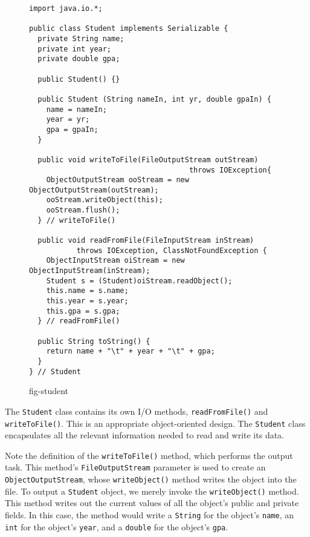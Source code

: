 \begin{figure}[tb]
\jjjprogstart
\begin{jjjlisting}[31pc]
\begin{lstlisting}
import java.io.*;

public class Student implements Serializable {
  private String name;
  private int year;
  private double gpa;

  public Student() {}

  public Student (String nameIn, int yr, double gpaIn) {
    name = nameIn;
    year = yr;
    gpa = gpaIn;
  }

  public void writeToFile(FileOutputStream outStream) 
                                     throws IOException{
    ObjectOutputStream ooStream = new ObjectOutputStream(outStream);
    ooStream.writeObject(this);
    ooStream.flush();
  } // writeToFile()

  public void readFromFile(FileInputStream inStream)  
           throws IOException, ClassNotFoundException {
    ObjectInputStream oiStream = new ObjectInputStream(inStream);
    Student s = (Student)oiStream.readObject();
    this.name = s.name;
    this.year = s.year;
    this.gpa = s.gpa;
  } // readFromFile()

  public String toString() {
    return name + "\t" + year + "\t" + gpa;
  }
} // Student
\end{lstlisting}
\end{jjjlisting}
{fig-student}
\end{figure}

The {\tt Student} class contains its own I/O methods,
{\tt readFromFile()} and {\tt writeToFile()}. This is an appropriate
object-oriented design.  The {\tt Student} class encapsulates
all the relevant information needed to read and write
its data.


\noindent Note the definition of the {\tt writeToFile()} method, which performs
the output task.  This method's {\tt FileOutputStream} parameter is
used to create an {\tt ObjectOutputStream}, whose {\tt writeObject()}
method writes the object into the file.   To output a
{\tt Student} object, we merely invoke the {\tt write\-Object()} method.  This
method writes out the current values of all the object's public and
private fields.  In this case, the method would write a {\tt String} for
the object's {\tt name}, an {\tt int} for the object's {\tt year}, and
a {\tt double} for the object's {\tt gpa}.

